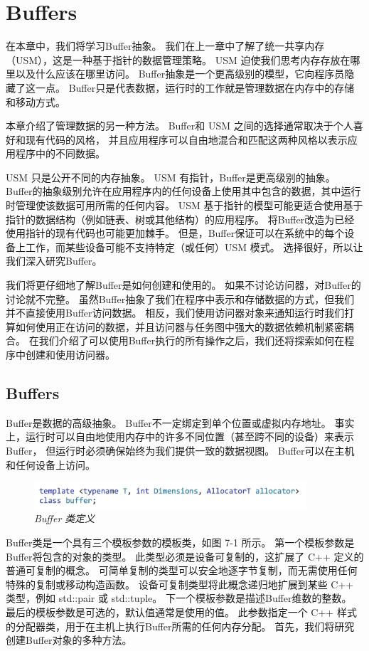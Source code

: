 \section{Buffers}
在本章中，我们将学习Buffer抽象。 我们在上一章中了解了统一共享内存（USM），这是一种基于指针的数据管理策略。 
USM 迫使我们思考内存存放在哪里以及什么应该在哪里访问。 Buffer抽象是一个更高级别的模型，它向程序员隐藏了这一点。 
Buffer只是代表数据，运行时的工作就是管理数据在内存中的存储和移动方式。

本章介绍了管理数据的另一种方法。 Buffer和 USM 之间的选择通常取决于个人喜好和现有代码的风格，
并且应用程序可以自由地混合和匹配这两种风格以表示应用程序中的不同数据。

USM 只是公开不同的内存抽象。 USM 有指针，Buffer是更高级别的抽象。 
Buffer的抽象级别允许在应用程序内的任何设备上使用其中包含的数据，其中运行时管理使该数据可用所需的任何内容。 
USM 基于指针的模型可能更适合使用基于指针的数据结构（例如链表、树或其他结构）的应用程序。 
将Buffer改造为已经使用指针的现有代码也可能更加棘手。 
但是，Buffer保证可以在系统中的每个设备上工作，而某些设备可能不支持特定（或任何）USM 模式。 
选择很好，所以让我们深入研究Buffer。

我们将更仔细地了解Buffer是如何创建和使用的。 如果不讨论访问器，对Buffer的讨论就不完整。 
虽然Buffer抽象了我们在程序中表示和存储数据的方式，但我们并不直接使用Buffer访问数据。 
相反，我们使用访问器对象来通知运行时我们打算如何使用正在访问的数据，并且访问器与任务图中强大的数据依赖机制紧密耦合。 
在我们介绍了可以使用Buffer执行的所有操作之后，我们还将探索如何在程序中创建和使用访问器。


\subsection{Buffers}
Buffer是数据的高级抽象。 Buffer不一定绑定到单个位置或虚拟内存地址。 
事实上，运行时可以自由地使用内存中的许多不同位置（甚至跨不同的设备）来表示Buffer，
但运行时必须确保始终为我们提供一致的数据视图。 Buffer可以在主机和任何设备上访问。

\begin{figure}[H]
	\centering
	\includegraphics[width=0.9\textwidth]{figs/F7.1.png}
	\caption{\textit{Buffer 类定义 }}
\end{figure}

Buffer类是一个具有三个模板参数的模板类，如图 7-1 所示。 第一个模板参数是Buffer将包含的对象的类型。 
此类型必须是设备可复制的，这扩展了 C++ 定义的普通可复制的概念。 
可简单复制的类型可以安全地逐字节复制，而无需使用任何特殊的复制或移动构造函数。 
设备可复制类型将此概念递归地扩展到某些 C++ 类型，例如 std::pair 或 std::tuple。 
下一个模板参数是描述Buffer维数的整数。 最后的模板参数是可选的，默认值通常是使用的值。 
此参数指定一个 C++ 样式的分配器类，用于在主机上执行Buffer所需的任何内存分配。 
首先，我们将研究创建Buffer对象的多种方法。

